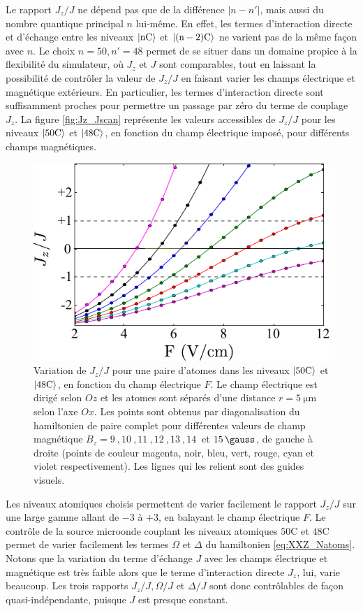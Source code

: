 Le rapport $J_z/J$ ne dépend pas que de la différence $|n-n'|$, mais aussi du nombre quantique principal $n$ lui-même.
En effet, les termes d'interaction directe et d'échange entre les niveaux $\ket{\mathrm{nC}}$ et $\ket{\mathrm{(n-2)C}}$ ne varient pas de la même façon avec $n$.
Le choix $n=50,n'=48$ permet de se situer dans un domaine propice à la flexibilité du simulateur, où $J_z$ et $J$ sont comparables, tout en laissant la possibilité de contrôler la valeur de $J_z/J$ en faisant varier les champs électrique et magnétique extérieurs.
En particulier, les termes d'interaction directe sont suffisamment proches pour permettre un passage par zéro du terme de couplage $J_z$.
La figure \eqref{fig:Jz_Jscan} représente les valeurs accessibles de $J_z/J$ pour les niveaux $\ket{\mathrm{50C}}$ et $\ket{\mathrm{48C}}$, en fonction du champ électrique imposé, pour différents champs magnétiques.
%
\begin{figure}[!h]
\centering
\includegraphics[width=0.7\linewidth]{figures/circsim/Jz_Jscan}
\caption[Variation de $J_z/J$]{
Variation de $J_z/J$ pour une paire d'atomes dans les niveaux $\ket{\mathrm{50C}}$ et $\ket{\mathrm{48C}}$, en fonction du champ électrique $F$.
Le champ électrique est dirigé selon $Oz$ et les atomes sont séparés d'une distance $r=\SI{5}{\um}$ selon l'axe $Ox$.
Les points sont obtenus par diagonalisation du hamiltonien de paire complet pour différentes valeurs de champ magnétique $B_z=\SI{9}{},\SI{10}{},\SI{11}{},\SI{12}{},\SI{13}{},\SI{14}{}$ et $\SI{15}{\gauss}$, de gauche à droite (points de couleur magenta, noir, bleu, vert, rouge, cyan et violet respectivement).
Les lignes qui les relient sont des guides visuels.
}
\label{fig:Jz_Jscan}
\end{figure}
%

Les niveaux atomiques choisis permettent de varier facilement le rapport $J_z/J$ sur une large gamme allant de $-3$ à $+3$, en balayant le champ électrique $F$.
Le contrôle de la source microonde couplant les niveaux atomiques $\mathrm{50C}$ et $\mathrm{48C}$ permet de varier facilement les termes $\Omega$ et $\Delta$ du hamiltonien \eqref{eq:XXZ_Natoms}.
Notons que la variation du terme d'échange $J$ avec les champs électrique et magnétique est très faible alors que le terme d'interaction directe $J_z$, lui, varie beaucoup.
Les trois rapports $J_z/J, \Omega/J$ et $\Delta/J$ sont donc contrôlables de façon quasi-indépendante, puisque $J$ est presque constant.


